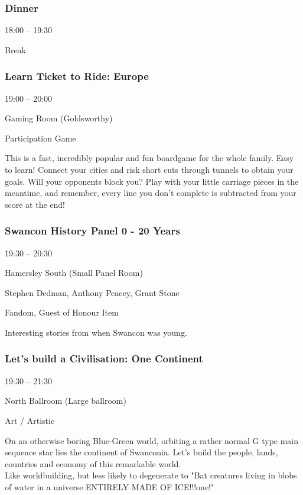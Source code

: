 \documentclass{scrreprt}
\begin{document}
\begin{multicols}{2}
\subsubsection*{Dinner}\begin{description}
\setlength{\itemsep}{0pt}
\setlength{\parsep}{0pt}
\setlength{\parskip}{0pt}
\item[Time:]{18:00 -- 19:30}
\item[Tags:]{Break}\end{description}

\subsubsection*{Learn Ticket to Ride: Europe}\begin{description}
\setlength{\itemsep}{0pt}
\setlength{\parsep}{0pt}
\setlength{\parskip}{0pt}
\item[Time:]{19:00 -- 20:00}
\item[Venue:]{Gaming Room (Goldsworthy)}
\item[Tags:]{Participation Game}\end{description}
This is a fast, incredibly popular and fun boardgame for the whole family. Easy to learn! Connect your cities and risk short cuts through tunnels to obtain your goals. Will your opponents block you? Play with your little carriage pieces in the meantime, and remember, every line you don't complete is subtracted from your score at the end!
\subsubsection*{Swancon History Panel 0 - 20 Years}\begin{description}
\setlength{\itemsep}{0pt}
\setlength{\parsep}{0pt}
\setlength{\parskip}{0pt}
\item[Time:]{19:30 -- 20:30}
\item[Venue:]{Hamersley South (Small Panel Room)}
\item[People:]{Stephen Dedman, Anthony Peacey, Grant Stone}
\item[Tags:]{Fandom, Guest of Honour Item}\end{description}
Interesting stories from when Swancon was young.
\subsubsection*{Let's build a Civilisation: One Continent}\begin{description}
\setlength{\itemsep}{0pt}
\setlength{\parsep}{0pt}
\setlength{\parskip}{0pt}
\item[Time:]{19:30 -- 21:30}
\item[Venue:]{North Ballroom (Large ballroom)}
\item[Tags:]{Art / Artistic}\end{description}
On an otherwise boring Blue-Green world, orbiting a rather normal G type main sequence star lies the continent of Swanconia. Let's build the people, lands, countries and economy of this remarkable world.\\Like worldbuilding, but less likely to degenerate to "Bat creatures living in blobs of water in a universe ENTIRELY MADE OF ICE!!!one!"

\end{multicols}
\end{document}
